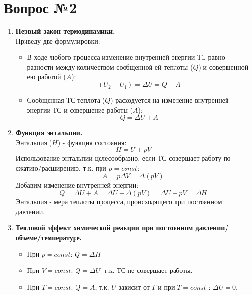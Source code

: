 \documentclass[14pt,a4paper]{scrartcl}
\begin{document}
\section*{Вопрос №2}
	\begin{enumerate}[label=\arabic*)]
		\item \textbf{Первый закон термодинамики.} \\
		Приведу две формулировки:
		\begin{itemize}
			\item В ходе любого процесса изменение внутренней энергии ТС равно разности между количеством сообщенной ей теплоты ($Q$) и совершенной ею работой ($A$):
			$$ (U_2 - U_1) = \Delta{U} = Q - A $$
			\item Сообщенная ТС теплота ($Q$) расходуется на изменение внутренней энергии ТС и совершение работы ($A$):
			$$ Q = \Delta{U} + A $$
		\end{itemize}
		\item \textbf{Функция энтальпии.} \\	
		Энтальпия ($H$) - функция состояния:
		$$ H = U + pV $$
		Использование энтальпии целесообразно, если ТС совершает  работу по сжатию/расширению, т.к. при $p = const$:
		$$ A = p \Delta{V} = \Delta{(pV)}  $$ 
		Добавим изменение внутренней энергии:
		$$Q = \Delta{U} + A = \Delta{U} + \Delta{(pV)} = \Delta{U + pV} = \Delta{H} $$
		\underline{Энтальпия - мера теплоты процесса, происходящего при постоянном давлении.} 
		
		\item \textbf{Тепловой эффект химической реакции при постоянном давлении/объеме/температуре.} \\
		\begin{itemize}
			\item При $p = const$: $Q = \Delta{H}$
			\item При $V = const$: $Q = \Delta{U}$, т.к. ТС не совершает работы.
			\item При $T = const$: $Q = A$, т.к. $U$ зависит от $T$ и при $T=const$ : $\Delta{U} = 0$.
		\end{itemize}
	

\end{enumerate}
\end{document}
